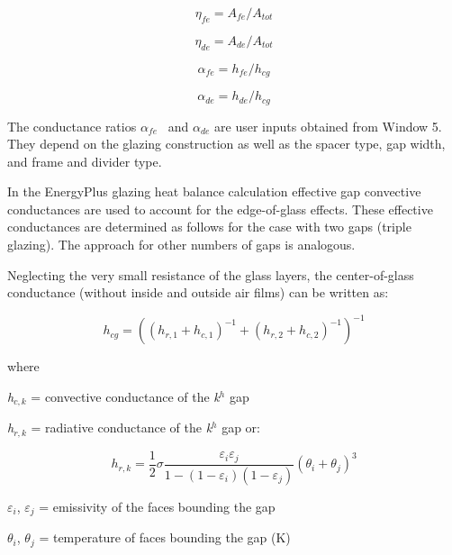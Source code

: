 \begin{equation}
{\eta_{fe}} = {A_{fe}}/{A_{tot}}
\end{equation}

\begin{equation}
{\eta_{de}} = {A_{de}}/{A_{tot}}
\end{equation}

\begin{equation}
{\alpha_{fe}} = {h_{fe}}/{h_{cg}}
\end{equation}

\begin{equation}
{\alpha_{de}} = {h_{de}}/{h_{cg}}
\end{equation}

The conductance ratios \({\alpha_{fe}}\) ~and \({\alpha_{de}}\) are user inputs obtained from Window 5. They depend on the glazing construction as well as the spacer type, gap width, and frame and divider type.

In the EnergyPlus glazing heat balance calculation effective gap convective conductances are used to account for the edge-of-glass effects. These effective conductances are determined as follows for the case with two gaps (triple glazing). The approach for other numbers of gaps is analogous.

Neglecting the very small resistance of the glass layers, the center-of-glass conductance (without inside and outside air films) can be written as:

\begin{equation}
{h_{cg}} = {\left( {{{\left( {{h_{r,1}} + {h_{c,1}}} \right)}^{ - 1}} + {{\left( {{h_{r,2}} + {h_{c,2}}} \right)}^{ - 1}}} \right)^{ - 1}}
\end{equation}

where

\emph{h\(_{c,k}\)} = convective conductance of the \emph{k\(^{h}\)} gap

\emph{h\(_{r,k}\)} = radiative conductance of the \emph{k\(^{h}\)} gap or:

\begin{equation}
h_{r,k}= \frac{1}{2}\sigma \frac{{{\varepsilon_i}{\varepsilon_j}}}{{1 - \left( {1 - {\varepsilon_i}} \right)\left( {1 - {\varepsilon_j}} \right)}}{\left( {{\theta_i} + {\theta_j}} \right)^3}
\end{equation}

$\varepsilon$\(_{i}\), $\varepsilon$\(_{j}\) = emissivity of the faces bounding the gap

$\theta$\(_{i}\), $\theta$\(_{j}\) = temperature of faces bounding the gap (K)

